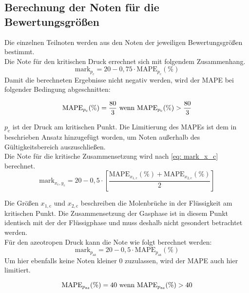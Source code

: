 \documentclass[../thesis.tex]{subfiles}
\begin{document}
\subsection{Berechnung der Noten für die Bewertungsgrößen}
Die einzelnen Teilnoten werden aus den Noten der jeweiligen Bewertungsgrößen bestimmt.
\\

Die Note für den kritischen Druck errechnet sich mit folgendem Zusammenhang.
\begin{equation}
	\mathrm{mark}_{p_{\mathrm{c}}} = 20 - 0,75 \cdot \mathrm{MAPE}_{p_\mathrm{c}}(\%)
\end{equation}
Damit die berechneten Ergebnisse nicht negativ werden, wird der MAPE bei folgender Bedingung abgeschnitten:

\begin{equation}
	\notag
	\mathrm{MAPE}_{p_\mathrm{c}}(\%) = \dfrac{80}{3} \text{ wenn } \mathrm{MAPE}_{p_\mathrm{c}}(\%) > \dfrac{80}{3}
\end{equation}

$ p_\mathrm{c} $ ist der Druck am kritischen Punkt. Die Limitierung des MAPEs ist dem in \cite{jaubert2020benchmark} beschrieben Ansatz hinzugefügt worden, um Noten außerhalb des Gültigkeitsbereich auszuschließen.
\\

Die Note für die kritische Zusammensetzung wird nach \autoref{eq: mark_x_c} berechnet.
\begin{equation}
\label{eq: mark_x_c}
\mathrm{mark}_{x_\mathrm{c},y_\mathrm{c}} = 20 - 0,5 \cdot \left[
	\dfrac{\mathrm{MAPE}_{x_{1,\mathrm{c}}}(\%) + \mathrm{MAPE}_{x_{2,\mathrm{c}}}(\%)}{2}
\right]
\end{equation}

Die Größen $ x_{1,\mathrm{c}} $ und $ x_{2,\mathrm{c}} $ beschreiben die Molenbrüche in der Flüssigkeit am kritischen Punkt. Die Zusammensetzung der Gasphase ist in diesem Punkt identisch mit der der Flüssigphase und muss deshalb nicht gesondert betrachtet werden.
\\

Für den azeotropen Druck kann die Note wie folgt berechnet werden:
\begin{equation}
	\mathrm{mark}_{p_{\mathrm{az}}} = 20 - 0,5 \cdot \mathrm{MAPE}_{p_\mathrm{az}}(\%)
\end{equation}
Um hier ebenfalls keine Noten kleiner 0 zuzulassen, wird der MAPE auch hier limitiert.

\begin{equation}
	\notag
	\label{eq: pheq_x_lim}
	\mathrm{MAPE}_{p_\mathrm{az}}(\%) = 40 \text{ wenn } \mathrm{MAPE}_{p_\mathrm{az}}(\%) > 40
\end{equation}
\end{document}
